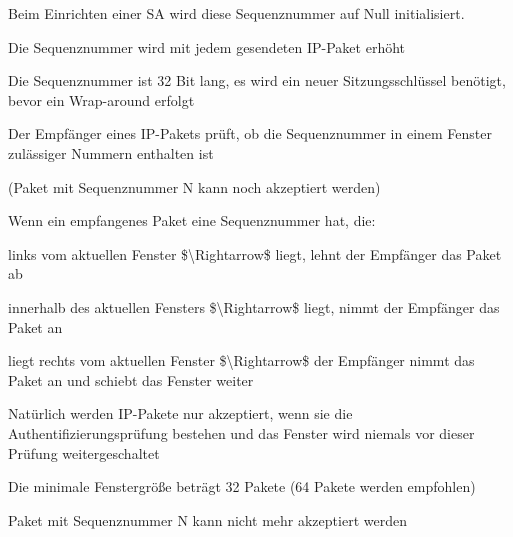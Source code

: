 \documentclass[a4paper]{article}
\begin{document}
\begin{multicols}{3}
\begin{itemize*}
            \begin{itemize*}
                  \item Beim Einrichten einer SA wird diese Sequenznummer auf Null initialisiert.
                  \item Die Sequenznummer wird mit jedem gesendeten IP-Paket erhöht
                  \item Die Sequenznummer ist 32 Bit lang, es wird ein neuer Sitzungsschlüssel benötigt, bevor ein Wrap-around erfolgt
                  \item Der Empfänger eines IP-Pakets prüft, ob die Sequenznummer in einem Fenster zulässiger Nummern enthalten ist
                  \begin{itemize*} \item (Paket mit Sequenznummer N kann noch akzeptiert werden) \end{itemize*}
            \end{itemize*}
            \item
            Wenn ein empfangenes Paket eine Sequenznummer hat, die:

            \begin{itemize*}
                  \item links vom aktuellen Fenster \$\textbackslash Rightarrow\$ liegt, lehnt der Empfänger das Paket ab
                  \item innerhalb des aktuellen Fensters \$\textbackslash Rightarrow\$ liegt, nimmt der Empfänger das Paket an
                  \item liegt rechts vom aktuellen Fenster \$\textbackslash Rightarrow\$ der Empfänger nimmt das Paket an und schiebt das Fenster weiter
                  \item Natürlich werden IP-Pakete nur akzeptiert, wenn sie die Authentifizierungsprüfung bestehen und das Fenster wird niemals vor dieser Prüfung weitergeschaltet
            \end{itemize*}
            \item
            Die minimale Fenstergröße beträgt 32 Pakete (64 Pakete werden
            empfohlen)

            \begin{itemize*}
                  \item Paket mit Sequenznummer N kann nicht mehr akzeptiert werden
            \end{itemize*}
      \end{itemize*}



\end{multicols}
\end{document}
